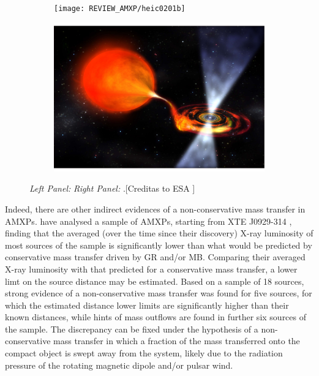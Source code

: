 \documentclass[graybox]{svmult}
\begin{document}
\begin{figure}
\begin{subfigure}{.5\textwidth}
  \centering
  \texttt{[image: REVIEW\_AMXP/heic0201b]}
  \label{fig:sfig1}
\end{subfigure}%
\begin{subfigure}{.5\textwidth}
  \centering
  \includegraphics[width=0.95\linewidth]{REVIEW_AMXP/making_a_Nova}
  \label{fig:sfig2}
\end{subfigure}
\caption{\textit{Left Panel:}  \textit{Right Panel:} .[Creditas to ESA ]}
\label{fig:con_mt}
\end{figure}




Indeed, there are other indirect evidences of a non-conservative mass transfer in AMXPs. \cite{Marino2019} have analysed a sample of AMXPs, starting from XTE J0929-314 \cite{Marino2017}, finding that the averaged (over the time since their discovery) X-ray luminosity of most sources of the sample is significantly lower than what would be predicted by conservative mass transfer driven by GR and/or MB. Comparing their averaged X-ray luminosity with that predicted for a conservative mass transfer, a lower limt on the source distance may be estimated. Based on a sample of 18 sources, strong evidence of a non-conservative mass transfer was found for five sources, for which the estimated distance lower limits are significantly higher than their known distances, while hints of mass outflows are found in further six sources of the sample. The discrepancy can be fixed under the hypothesis of a non-conservative mass transfer in which a fraction of the mass transferred onto the compact object is swept away from the system, likely due to the radiation pressure of the rotating magnetic dipole and/or pulsar wind.
\end{document}

